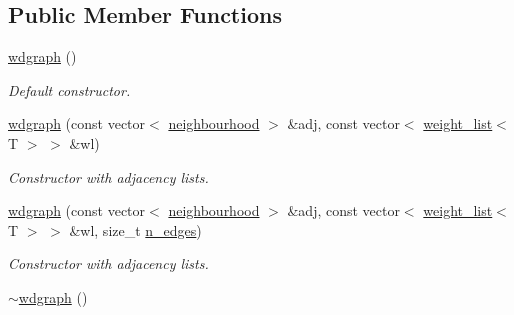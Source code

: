 \subsection*{Public Member Functions}
\begin{DoxyCompactItemize}
\item 
\hyperlink{classlgraph_1_1utils_1_1wdgraph_a5b2ab9227ed3ea23596eebb4b4f397cb}{wdgraph} ()\hypertarget{classlgraph_1_1utils_1_1wdgraph_a5b2ab9227ed3ea23596eebb4b4f397cb}{}\label{classlgraph_1_1utils_1_1wdgraph_a5b2ab9227ed3ea23596eebb4b4f397cb}

\begin{DoxyCompactList}\small\item\em Default constructor. \end{DoxyCompactList}\item 
\hyperlink{classlgraph_1_1utils_1_1wdgraph_aa4af7af163857c281640c0780e5122a4}{wdgraph} (const vector$<$ \hyperlink{namespacelgraph_1_1utils_a0f2ef47028a466d26841709e705390ac}{neighbourhood} $>$ \&adj, const vector$<$ \hyperlink{namespacelgraph_1_1utils_a11e7963f3637ea13778b8d3e69d2c17f}{weight\+\_\+list}$<$ T $>$ $>$ \&wl)
\begin{DoxyCompactList}\small\item\em Constructor with adjacency lists. \end{DoxyCompactList}\item 
\hyperlink{classlgraph_1_1utils_1_1wdgraph_a6f71fd55d16900a657aeb161114eccd7}{wdgraph} (const vector$<$ \hyperlink{namespacelgraph_1_1utils_a0f2ef47028a466d26841709e705390ac}{neighbourhood} $>$ \&adj, const vector$<$ \hyperlink{namespacelgraph_1_1utils_a11e7963f3637ea13778b8d3e69d2c17f}{weight\+\_\+list}$<$ T $>$ $>$ \&wl, size\+\_\+t \hyperlink{classlgraph_1_1utils_1_1xxgraph_af3f7c3835406c2cbf70479ae1c0253c9}{n\+\_\+edges})
\begin{DoxyCompactList}\small\item\em Constructor with adjacency lists. \end{DoxyCompactList}\item 
\hyperlink{classlgraph_1_1utils_1_1wdgraph_ad5d7319df97007af7f2d6d3bc994c679}{$\sim$wdgraph} ()\hypertarget{classlgraph_1_1utils_1_1wdgraph_ad5d7319df97007af7f2d6d3bc994c679}{}\label{classlgraph_1_1utils_1_1wdgraph_ad5d7319df97007af7f2d6d3bc994c679}


\end{DoxyCompactItemize}
